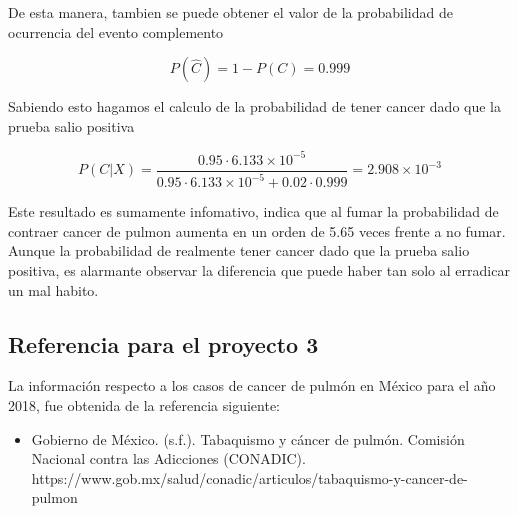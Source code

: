 \documentclass{article}
\begin{document}
De esta manera, tambien se puede obtener el valor de la probabilidad de ocurrencia del evento complemento 



\begin{equation}
    P(\hat{C}) = 1 - P(C) = 0.999 
\end{equation}


Sabiendo esto hagamos el calculo de la probabilidad de tener cancer dado que la prueba salio positiva


\begin{equation}
    P(C|X) = \frac{0.95 \cdot 6.133 \times 10^{-5}}{0.95 \cdot 6.133 \times 10^{-5} + 0.02 \cdot 0.999 } = 2.908\times 10^{-3}
\end{equation}

Este resultado es sumamente infomativo, indica que al fumar la probabilidad de contraer cancer de pulmon aumenta en un orden de 5.65 veces frente a no fumar. Aunque la probabilidad de realmente tener cancer dado que la prueba salio positiva, es alarmante observar la diferencia que puede haber tan solo al erradicar un mal habito. 



\subsection*{Referencia para el proyecto 3}


La información respecto a los casos de cancer de pulmón en México para el año 2018, fue obtenida de la referencia siguiente:


\begin{itemize}
    \item Gobierno de México. (s.f.). Tabaquismo y cáncer de pulmón. Comisión Nacional contra las Adicciones (CONADIC). https://www.gob.mx/salud/conadic/articulos/tabaquismo-y-cancer-de-pulmon
\end{itemize}

\vspace{10pt}
\end{document}
